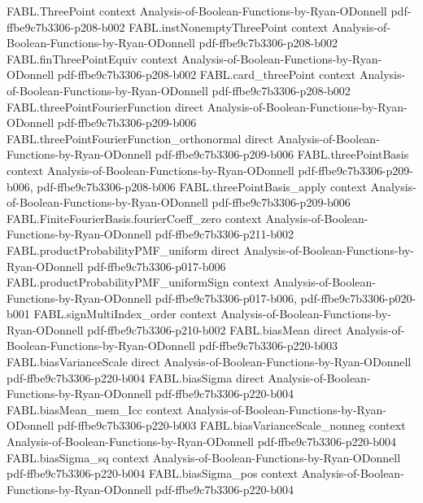 \begin{theorem}
\proofstep
  {FABL.ThreePoint}
  {context}
  {Analysis-of-Boolean-Functions-by-Ryan-ODonnell}
  {pdf-ffbe9c7b3306-p208-b002}
\proofstep
  {FABL.instNonemptyThreePoint}
  {context}
  {Analysis-of-Boolean-Functions-by-Ryan-ODonnell}
  {pdf-ffbe9c7b3306-p208-b002}
\proofstep
  {FABL.finThreePointEquiv}
  {context}
  {Analysis-of-Boolean-Functions-by-Ryan-ODonnell}
  {pdf-ffbe9c7b3306-p208-b002}
\proofstep
  {FABL.card_threePoint}
  {context}
  {Analysis-of-Boolean-Functions-by-Ryan-ODonnell}
  {pdf-ffbe9c7b3306-p208-b002}
\proofstep
  {FABL.threePointFourierFunction}
  {direct}
  {Analysis-of-Boolean-Functions-by-Ryan-ODonnell}
  {pdf-ffbe9c7b3306-p209-b006}
\proofstep
  {FABL.threePointFourierFunction_orthonormal}
  {direct}
  {Analysis-of-Boolean-Functions-by-Ryan-ODonnell}
  {pdf-ffbe9c7b3306-p209-b006}
\proofstep
  {FABL.threePointBasis}
  {context}
  {Analysis-of-Boolean-Functions-by-Ryan-ODonnell}
  {pdf-ffbe9c7b3306-p209-b006,
    pdf-ffbe9c7b3306-p208-b006}
\proofstep
  {FABL.threePointBasis_apply}
  {context}
  {Analysis-of-Boolean-Functions-by-Ryan-ODonnell}
  {pdf-ffbe9c7b3306-p209-b006}
\proofstep
  {FABL.FiniteFourierBasis.fourierCoeff_zero}
  {context}
  {Analysis-of-Boolean-Functions-by-Ryan-ODonnell}
  {pdf-ffbe9c7b3306-p211-b002}
\proofstep
  {FABL.productProbabilityPMF_uniform}
  {direct}
  {Analysis-of-Boolean-Functions-by-Ryan-ODonnell}
  {pdf-ffbe9c7b3306-p017-b006}
\proofstep
  {FABL.productProbabilityPMF_uniformSign}
  {context}
  {Analysis-of-Boolean-Functions-by-Ryan-ODonnell}
  {pdf-ffbe9c7b3306-p017-b006,
    pdf-ffbe9c7b3306-p020-b001}
\proofstep
  {FABL.signMultiIndex_order}
  {context}
  {Analysis-of-Boolean-Functions-by-Ryan-ODonnell}
  {pdf-ffbe9c7b3306-p210-b002}
\proofstep
  {FABL.biasMean}
  {direct}
  {Analysis-of-Boolean-Functions-by-Ryan-ODonnell}
  {pdf-ffbe9c7b3306-p220-b003}
\proofstep
  {FABL.biasVarianceScale}
  {direct}
  {Analysis-of-Boolean-Functions-by-Ryan-ODonnell}
  {pdf-ffbe9c7b3306-p220-b004}
\proofstep
  {FABL.biasSigma}
  {direct}
  {Analysis-of-Boolean-Functions-by-Ryan-ODonnell}
  {pdf-ffbe9c7b3306-p220-b004}
\proofstep
  {FABL.biasMean_mem_Icc}
  {context}
  {Analysis-of-Boolean-Functions-by-Ryan-ODonnell}
  {pdf-ffbe9c7b3306-p220-b003}
\proofstep
  {FABL.biasVarianceScale_nonneg}
  {context}
  {Analysis-of-Boolean-Functions-by-Ryan-ODonnell}
  {pdf-ffbe9c7b3306-p220-b004}
\proofstep
  {FABL.biasSigma_sq}
  {context}
  {Analysis-of-Boolean-Functions-by-Ryan-ODonnell}
  {pdf-ffbe9c7b3306-p220-b004}
\proofstep
  {FABL.biasSigma_pos}
  {context}
  {Analysis-of-Boolean-Functions-by-Ryan-ODonnell}
  {pdf-ffbe9c7b3306-p220-b004}

\end{theorem}
